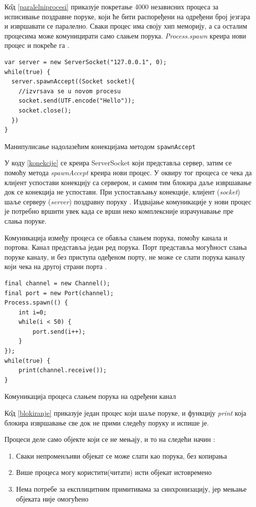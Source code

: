 \documentclass[12pt,oneside]{memoir}
\begin{document}
К\^{о}д \ref{paralelniprocesi} приказује покретање 4000 независних процеса за исписивање поздравне поруке, који ће бити распоређени на одређени број језгара и извршавати се паралелно. Сваки процес има своју хип меморију, а са осталим процесима може комуницирати само слањем порука. \textit{Process.spawn} креира нови процес и покреће га \cite{procesi_i_izolate}.

\begin{listing}
\begin{verbatim}
var server = new ServerSocket("127.0.0.1", 0);
while(true) {
  server.spawnAccept((Socket socket){
	//izvrsava se u novom procesu
	socket.send(UTF.encode("Hello"));
	socket.close();
  })
}
\end{verbatim}
\caption{Манипулисање надолазећим конекцијама методом \texttt{spawnAccept}}
\label{konekcije}
\end{listing}

У коду \ref{konekcije} се креира ServerSocket који представља сервер, затим се помоћу метода \textit{spawnAccept} креира нови процес. У оквиру тог процеса се чека да клијент успостави конекцију са сервером, и самим тим блокира даље извршавање док се конекција не успостави. При успостављању конекције, клијент (\textit{socket}) шаље серверу (\textit{server}) поздравну поруку \cite{Dartino}. Издвајање комуникације у нови процес је потребно вршити увек када се врши неко комплексније израчунавање пре слања поруке.

Комуникација између процеса се обавља слањем порука, помоћу канала и портова. Канал представља један ред порука. Порт представља могућност слања поруке каналу, и без приступа одеђеном порту, не може се слати порука каналу који чека на другој страни порта \cite{Dartino}.

\begin{listing}
\begin{verbatim}
final channel = new Channel();
final port = new Port(channel);
Process.spawn(() {
	int i=0;
	while(i < 50) {
		port.send(i++);
	}
});
while(true) {
	print(channel.receive());
}
\end{verbatim}
\caption{Комуникација процеса слањем порука на одређени канал}
\label{blokiranje}
\end{listing}

К\^{о}д \ref{blokiranje} приказује један процес који шаље поруке, и функцију \textit{print} која блокира извршавање све док не прими следећу поруку и испише је.

Процеси деле само објекте који се не мењају, и то на следећи начин \cite{Dartino}:
\begin{enumerate}
\item Сваки непроменљиви објекат се може слати као порука, без копирања
\item Више процеса могу користити(читати) исти објекат истовремено
\item Нема потребе за експлицитним примитивама за синхронизацију, јер мењање објеката није омогућено
\end{enumerate}
\end{document}
